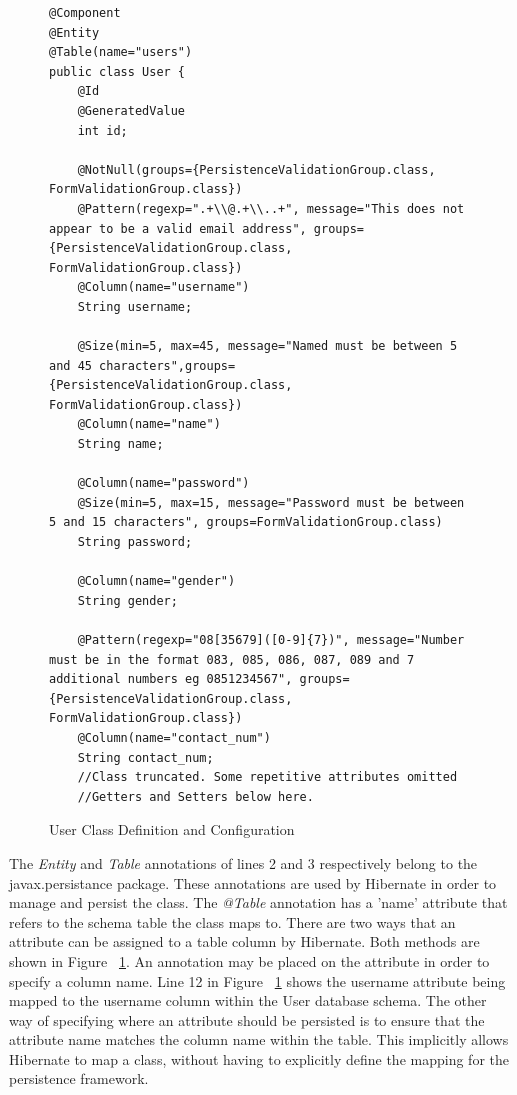 \begin{figure}[H]
\begin{lstlisting}
@Component
@Entity
@Table(name="users")
public class User {
	@Id
	@GeneratedValue
	int id;
	
	@NotNull(groups={PersistenceValidationGroup.class, FormValidationGroup.class})
	@Pattern(regexp=".+\\@.+\\..+", message="This does not appear to be a valid email address", groups={PersistenceValidationGroup.class, FormValidationGroup.class})
	@Column(name="username")
	String username;
	
	@Size(min=5, max=45, message="Named must be between 5 and 45 characters",groups={PersistenceValidationGroup.class, FormValidationGroup.class})
	@Column(name="name")
	String name;
	
	@Column(name="password")
	@Size(min=5, max=15, message="Password must be between 5 and 15 characters", groups=FormValidationGroup.class)
	String password;
	
	@Column(name="gender")
	String gender;
	
	@Pattern(regexp="08[35679]([0-9]{7})", message="Number must be in the format 083, 085, 086, 087, 089 and 7 additional numbers eg 0851234567", groups={PersistenceValidationGroup.class, FormValidationGroup.class})
	@Column(name="contact_num")
	String contact_num;
	//Class truncated. Some repetitive attributes omitted
	//Getters and Setters below here.
\end{lstlisting}
\caption{User Class Definition and Configuration}
\label{fig:userDef}
\end{figure}

The \textit{Entity} and \textit{Table} annotations of lines 2 and 3 respectively belong to the javax.persistance package. These annotations are used by Hibernate in order to manage and persist the class. The \textit{@Table} annotation has a 'name' attribute that refers to the schema table the class maps to. There are two ways that an attribute can be assigned to a table column by Hibernate. Both methods are shown in Figure ~\ref{fig:userDef}. An annotation may be placed on the attribute in order to specify a column name. Line 12 in Figure ~\ref{fig:userDef} shows the username attribute being mapped to the username column within the User database schema. The other way of specifying where an attribute should be persisted is to ensure that the attribute name matches the column name within the table. This implicitly allows Hibernate to map a class, without having to explicitly define the mapping for the persistence framework.

